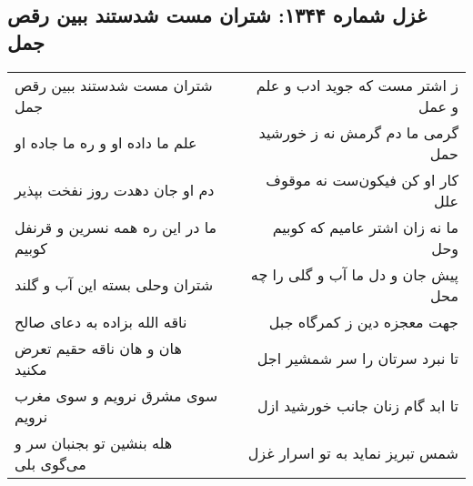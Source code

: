 \begin{center}
\section*{غزل شماره ۱۳۴۴: شتران مست شدستند ببین رقص جمل}
\label{sec:1344}
\begin{longtable}{l p{0.5cm} r}
شتران مست شدستند ببین رقص جمل
&&
ز اشتر مست که جوید ادب و علم و عمل
\\
علم ما داده او و ره ما جاده او
&&
گرمی ما دم گرمش نه ز خورشید حمل
\\
دم او جان دهدت روز نفخت بپذیر
&&
کار او کن فیکون‌ست نه موقوف علل
\\
ما در این ره همه نسرین و قرنفل کوبیم
&&
ما نه زان اشتر عامیم که کوبیم وحل
\\
شتران وحلی بسته این آب و گلند
&&
پیش جان و دل ما آب و گلی را چه محل
\\
ناقه الله بزاده به دعای صالح
&&
جهت معجزه دین ز کمرگاه جبل
\\
هان و هان ناقه حقیم تعرض مکنید
&&
تا نبرد سرتان را سر شمشیر اجل
\\
سوی مشرق نرویم و سوی مغرب نرویم
&&
تا ابد گام زنان جانب خورشید ازل
\\
هله بنشین تو بجنبان سر و می‌گوی بلی
&&
شمس تبریز نماید به تو اسرار غزل
\\
\end{longtable}
\end{center}
